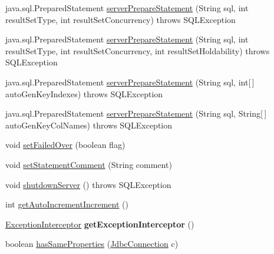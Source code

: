 \begin{DoxyCompactItemize}
\item 
java.\+sql.\+Prepared\+Statement \mbox{\hyperlink{classcom_1_1mysql_1_1cj_1_1jdbc_1_1_connection_wrapper_a764bc7940c1fb384724ba3bc18572978}{server\+Prepare\+Statement}} (String sql, int result\+Set\+Type, int result\+Set\+Concurrency)  throws S\+Q\+L\+Exception 
\item 
java.\+sql.\+Prepared\+Statement \mbox{\hyperlink{classcom_1_1mysql_1_1cj_1_1jdbc_1_1_connection_wrapper_a64bd494b5f5ad72d744fcc7236a5501d}{server\+Prepare\+Statement}} (String sql, int result\+Set\+Type, int result\+Set\+Concurrency, int result\+Set\+Holdability)  throws S\+Q\+L\+Exception 
\item 
java.\+sql.\+Prepared\+Statement \mbox{\hyperlink{classcom_1_1mysql_1_1cj_1_1jdbc_1_1_connection_wrapper_a9ae046833df9f5a89755a54dd65d43b0}{server\+Prepare\+Statement}} (String sql, int\mbox{[}$\,$\mbox{]} auto\+Gen\+Key\+Indexes)  throws S\+Q\+L\+Exception 
\item 
java.\+sql.\+Prepared\+Statement \mbox{\hyperlink{classcom_1_1mysql_1_1cj_1_1jdbc_1_1_connection_wrapper_a02f353527ecf3306019227fa68d014a7}{server\+Prepare\+Statement}} (String sql, String\mbox{[}$\,$\mbox{]} auto\+Gen\+Key\+Col\+Names)  throws S\+Q\+L\+Exception 
\item 
void \mbox{\hyperlink{classcom_1_1mysql_1_1cj_1_1jdbc_1_1_connection_wrapper_aaa41827ca4520529797d55c4f8834f76}{set\+Failed\+Over}} (boolean flag)
\item 
void \mbox{\hyperlink{classcom_1_1mysql_1_1cj_1_1jdbc_1_1_connection_wrapper_a79c9fe73cc7069028015a7e3e6a383fb}{set\+Statement\+Comment}} (String comment)
\item 
void \mbox{\hyperlink{classcom_1_1mysql_1_1cj_1_1jdbc_1_1_connection_wrapper_a0989b3c99444046219ef68a1e15863c9}{shutdown\+Server}} ()  throws S\+Q\+L\+Exception 
\item 
int \mbox{\hyperlink{classcom_1_1mysql_1_1cj_1_1jdbc_1_1_connection_wrapper_a0855a0981bb14e92fee22c3591d95175}{get\+Auto\+Increment\+Increment}} ()
\item 
\mbox{\label{classcom_1_1mysql_1_1cj_1_1jdbc_1_1_connection_wrapper_a3f7f70fcff77c01e2e8d4bf12802d0e0}} 
\mbox{\hyperlink{interfacecom_1_1mysql_1_1cj_1_1exceptions_1_1_exception_interceptor}{Exception\+Interceptor}} {\bfseries get\+Exception\+Interceptor} ()
\item 
boolean \mbox{\hyperlink{classcom_1_1mysql_1_1cj_1_1jdbc_1_1_connection_wrapper_a10dadfff0a559ba28835c1a0e95379d6}{has\+Same\+Properties}} (\mbox{\hyperlink{interfacecom_1_1mysql_1_1cj_1_1jdbc_1_1_jdbc_connection}{Jdbc\+Connection}} c)

\end{DoxyCompactItemize}
